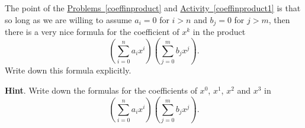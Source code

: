 \documentclass{book}
\begin{document}
\setcounter{cpjt}{247}
\addtocounter{cpjt}{-1}
\begin{activity}\label{coeffinproduct2}
\hypertarget{p-1290}{}%
The point of the \hyperref[coeffinproduct]{Problems~\ref{coeffinproduct}} and \hyperref[coeffinproduct1]{Activity~\ref{coeffinproduct1}} is that so long as we are willing to assume \(a_i=0\) for \(i>n\) and \(b_j =0\) for \(j>m\), then there is a very nice formula for the coefficient of \(x^k\) in the product%
\begin{equation*}
\left(\sum_{i=0}^n a_ix^i\right)\left(\sum_{j=0}^m b_jx^j\right).
\end{equation*}
Write down this formula explicitly.%
\par\smallskip%
\noindent\textbf{Hint}.\hypertarget{hint-156}{}\quad%
\hypertarget{p-1291}{}%
Write down the formulas for the coefficients of \(x^0\), \(x^1\), \(x^2\) and \(x^3\) in%
\begin{equation*}
\left(\sum_{i=0}^n a_ix^i\right)\left(\sum_{j=0}^m b_jx^j\right)\text{.}
\end{equation*}
%
\par\smallskip%
\noindent\end{activity}

\clearpage
\end{document}
